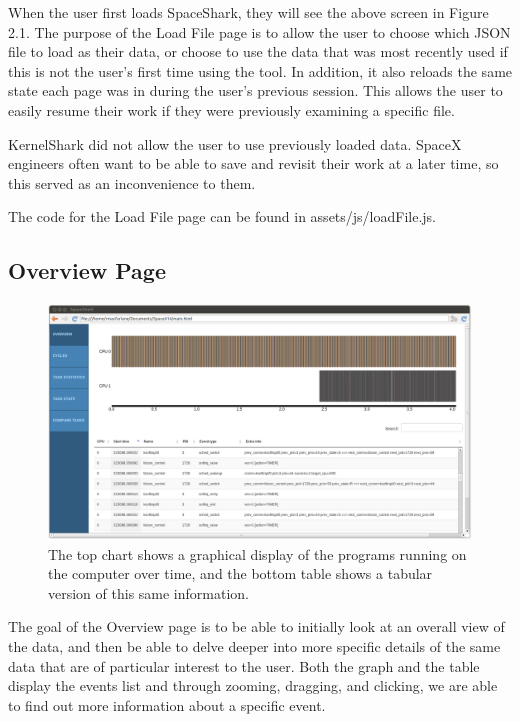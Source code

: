 \documentclass{hmcclinic}
\begin{document}
When the user first loads SpaceShark, they will see the above screen in Figure
2.1. The purpose of the Load File page is to allow the user to choose which JSON file to load as their data, 
or choose to use the data that was most recently used if this is not the user's first time using 
the tool. In addition, it also reloads the same state each page was in during
the user's previous session. This allows the user to easily resume their work if they were previously examining a specific file.

KernelShark did not allow the user to use previously loaded data. SpaceX engineers often want to be able to save and revisit their work at a later time, so this served as an inconvenience to them. 

The code for the Load File page can be found in assets/js/loadFile.js.

  \subsection{Overview Page} 
  
  \begin{figure}[H]
  \centering
      \includegraphics[width=5in]{overview-page.png}
  \caption{The top chart shows a graphical display of the programs running on the computer over time, and the bottom table shows a tabular version of this same information.}
  \end{figure}
  
The goal of the Overview page is to be able to initially look at an overall view
of the data, and then be able to delve deeper into more specific details of the
same data that are of particular interest to the user. Both
the graph and the table display the events list and through zooming, dragging,
and clicking, we are able to find out more information about a specific event.
\end{document}

